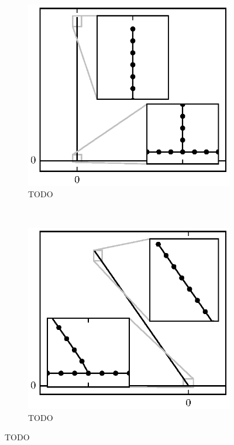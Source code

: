 	\begin{figure}[t]
		\centering
		\begin{subfigure}{.5\textwidth}
			\centering
			\includegraphics{./fig/ch3/fs/b10_eb1.eps}
			\caption{TODO \label{subfig:fs_erect}}
		\end{subfigure}%
		~
		\begin{subfigure}{.5\textwidth}
			\centering
			\includegraphics{./fig/ch3/fs/b10_eb3.eps}
			\caption{TODO\label{subfig:fs_erectlean}}
		\end{subfigure}
		\caption{TODO\label{fig:fs_erect}}
	\end{figure}
	
